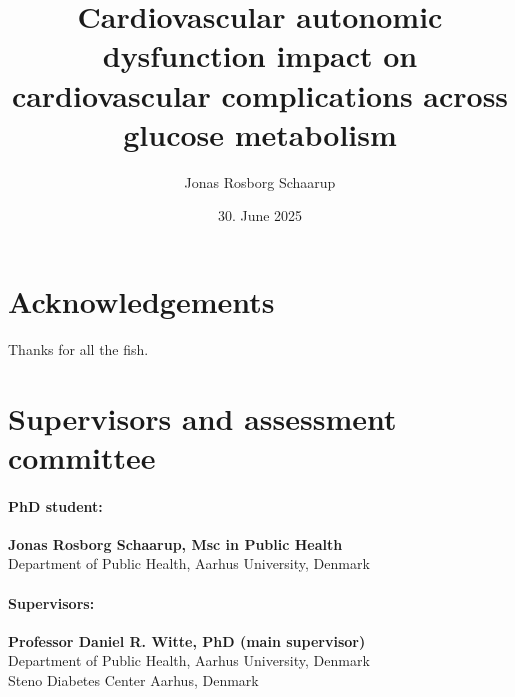 \documentclass[
  a4paper,
  headsepline=true,
  open=any]{scrbook}
\title{Cardiovascular autonomic dysfunction impact on cardiovascular
complications across glucose metabolism}
\author{Jonas Rosborg Schaarup}
\date{30. June 2025}
\begin{document}
\frontmatter
\maketitle
\ifdefined\Shaded\renewenvironment{Shaded}{\begin{tcolorbox}[boxrule=0pt, interior hidden, borderline west={3pt}{0pt}{shadecolor}, frame hidden, sharp corners, enhanced, breakable]}{\end{tcolorbox}}\fi

\mainmatter
{}

\hypertarget{acknowledgements}{%
\chapter*{Acknowledgements}\label{acknowledgements}}


Thanks for all the fish.


\hypertarget{supervisors-and-assessment-committee}{%
\chapter*{Supervisors and assessment
committee}\label{supervisors-and-assessment-committee}}


\hypertarget{phd-student}{%
\subsubsection*{PhD student:}\label{phd-student}}

\textbf{Jonas Rosborg Schaarup, Msc in Public Health}\\
Department of Public Health, Aarhus University, Denmark

\hypertarget{supervisors}{%
\subsubsection*{Supervisors:}\label{supervisors}}

\textbf{Professor Daniel R. Witte, PhD (main supervisor)}\\
Department of Public Health, Aarhus University, Denmark\\
Steno Diabetes Center Aarhus, Denmark
\end{document}
